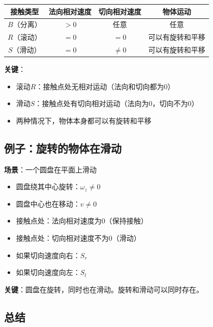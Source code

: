 \documentclass[12pt,a4paper]{article}
\begin{document}
\begin{center}
\begin{tabular}{|c|c|c|c|}
\hline
\textbf{接触类型} & \textbf{法向相对速度} & \textbf{切向相对速度} & \textbf{物体运动} \\
\hline
$B$（分离） & $> 0$ & 任意 & 任意 \\
\hline
$R$（滚动） & $= 0$ & $= 0$ & 可以有旋转和平移 \\
\hline
$S$（滑动） & $= 0$ & $\neq 0$ & 可以有旋转和平移 \\
\hline
\end{tabular}
\end{center}

\textbf{关键}：
\begin{itemize}
\item 滚动$R$：接触点处无相对运动（法向和切向都为0）
\item 滑动$S$：接触点处有切向相对运动（法向为0，切向不为0）
\item 两种情况下，物体本身都可以有旋转和平移
\end{itemize}

\subsection{例子：旋转的物体在滑动}

\textbf{场景}：一个圆盘在平面上滑动

\begin{itemize}
\item 圆盘绕其中心旋转：$\omega_z \neq 0$
\item 圆盘中心也在移动：$v \neq 0$
\item 接触点处：法向相对速度为0（保持接触）
\item 接触点处：切向相对速度不为0（滑动）
\item 如果切向速度向右：$S_r$
\item 如果切向速度向左：$S_l$
\end{itemize}

\textbf{关键}：圆盘在旋转，同时也在滑动。旋转和滑动可以同时存在。

\subsection{总结}
\end{document}
